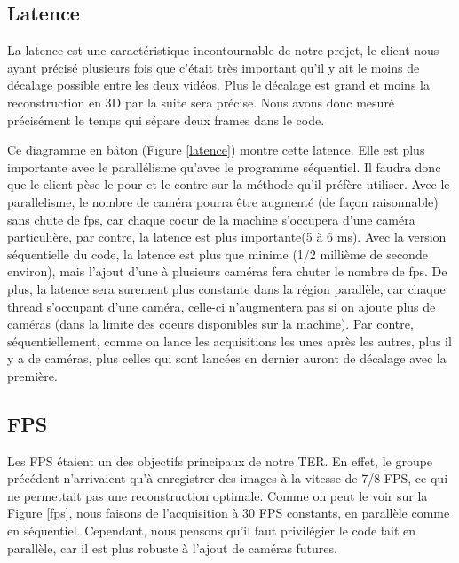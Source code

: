 \subsection{Latence}

La latence est une caractéristique incontournable de notre projet, le client nous ayant précisé plusieurs fois que c'était très important qu'il y ait le moins de décalage possible entre les deux vidéos. Plus le décalage est grand et moins la reconstruction en 3D par la suite sera précise. Nous avons donc mesuré précisément le temps qui sépare deux frames dans le code. 

Ce diagramme en bâton (Figure \ref{latence}) montre cette latence. Elle est plus importante avec le parallélisme qu'avec le programme séquentiel. Il faudra donc que le client pèse le pour et le contre sur la méthode qu'il préfère utiliser. Avec le parallelisme, le nombre de caméra pourra être augmenté (de façon raisonnable) sans chute de fps, car chaque coeur de la machine s'occupera d'une caméra particulière, par contre, la latence est plus importante(5 à 6 ms). Avec la version séquentielle du code, la latence est plus que minime (1/2 millième de seconde environ), mais l'ajout d'une à plusieurs caméras fera chuter le nombre de fps.
De plus, la latence sera surement plus constante dans la région parallèle, car chaque thread s'occupant d'une caméra, celle-ci n'augmentera pas si on ajoute plus de caméras (dans la limite des coeurs disponibles sur la machine). Par contre, séquentiellement, comme on lance les acquisitions les unes après les autres, plus il y a de caméras, plus celles qui sont lancées en dernier auront de décalage avec la première.

\subsection{FPS}

Les FPS étaient un des objectifs principaux de notre TER. En effet, le groupe précédent n'arrivaient qu'à enregistrer des images à la vitesse de 7/8 FPS, ce qui ne permettait pas une reconstruction optimale. Comme on peut le voir sur la Figure \ref{fps}, nous faisons de l'acquisition à 30 FPS constants, en parallèle comme en séquentiel. Cependant, nous pensons qu'il faut privilégier le code fait en parallèle, car il est plus robuste à l'ajout de caméras futures.

